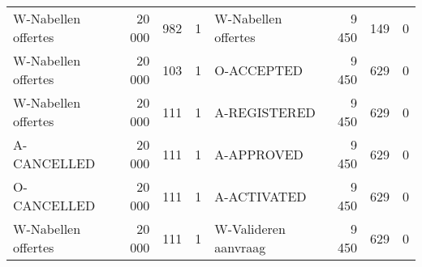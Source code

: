 \begin{table}
\begin{tabular}{lrlrlrlr}
W-Nabellen offertes & 20 000 & 982 & 1 & W-Nabellen offertes & 9 450 & 149 & 0 \\
W-Nabellen offertes & 20 000 & 103 & 1 & O-ACCEPTED & 9 450 & 629 & 0 \\
W-Nabellen offertes & 20 000 & 111 & 1 & A-REGISTERED & 9 450 & 629 & 0 \\
A-CANCELLED & 20 000 & 111 & 1 & A-APPROVED & 9 450 & 629 & 0 \\
O-CANCELLED & 20 000 & 111 & 1 & A-ACTIVATED & 9 450 & 629 & 0 \\
W-Nabellen offertes & 20 000 & 111 & 1 & W-Valideren aanvraag & 9 450 & 629 & 0 \\
\bottomrule
\end{tabular}
\end{table}
